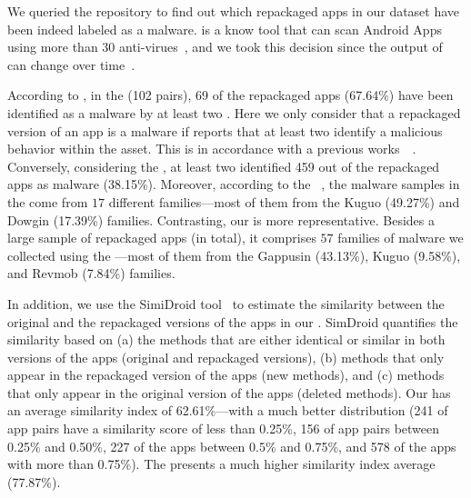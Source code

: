 We queried the \vt repository to find out which repackaged apps in our
dataset have been indeed labeled as a malware. \vt is a know tool that can scan Android Apps using more than $30$ anti-virues~\cite{DBLP:journals/ese/KhanmohammadiEH19}, and we took this decision since the output of \vt can change over time~\cite{vt-label}.

According to \vt, in the \sds (102 pairs),
69 of the repackaged apps (67.64\%) have been identified as a malware by at least two
\ses. Here we only consider that a repackaged version of an app is a malware if \vt reports that at least
two \ses identify a malicious behavior within the asset. This is in accordance with a previous works~\cite{vt-label}~\cite{ DBLP:journals/ese/KhanmohammadiEH19}. Conversely, considering the \cds, at least two \se identified 459 out of the \apps repackaged apps as malware (38.15\%).
Moreover, according to the
\avt~\cite{avclass2-paper}, the malware samples in the \sds come from $17$ different families---most of them from the Kuguo (49.27\%) and Dowgin (17.39\%) families.
Contrasting, our \cds is more representative. Besides a large sample of repackaged apps (\apps in total), it
comprises $57$ families of malware we collected using the \avt ---most
of them from the Gappusin (43.13\%), Kuguo (9.58\%), and Revmob (7.84\%) families.

In addition, we use the SimiDroid tool~\cite{DBLP:conf/trustcom/0029BK17} to
estimate the similarity between the original and the repackaged versions of the
apps in our \cds. SimDroid quantifies the similarity
based on (a) the methods that are either identical or similar in both versions of the apps (original and repackaged versions),
(b) methods that only appear in the repackaged version of the apps (new methods), and (c) methods that only appear in the
original version of the apps (deleted methods).
Our \cds has an average similarity index of 62.61\%---with a much better distribution (241 of
app pairs have a similarity score of less than 0.25\%, 156 of app pairs
between 0.25\% and 0.50\%, 227 of the apps between 0.5\% and 0.75\%,
and 578 of the apps with more than 0.75\%). The \sds presents a much higher
similarity index average (77.87\%). 

